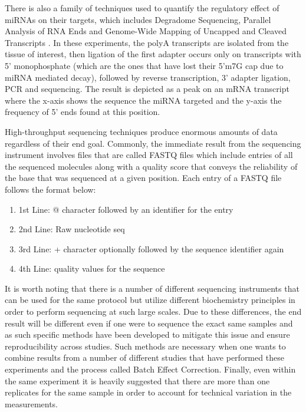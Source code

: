 \documentclass[en,ack]{dimscthesis}
\begin{document}
\par There is also a family of techniques used to quantify the regulatory effect of miRNAs on their targets, which includes Degradome Sequencing, Parallel Analysis of RNA Ends and Genome-Wide Mapping of Uncapped and Cleaved Transcripts \parencite{gregoryLinkRNAMetabolism2008, addo-quayeEndogenousSiRNAMiRNA2008, germanConstructionParallelAnalysis2009}. In these experiments, the polyA transcripts are isolated from the tissue of interest, then ligation of the first adapter occurs only on transcripts with 5' monophosphate (which are the ones that have lost their 5'm7G cap due to miRNA mediated decay), followed by reverse transcription, 3' adapter ligation, PCR and sequencing. The result is depicted as a peak on an mRNA transcript where the x-axis shows the sequence the miRNA targeted and the y-axis the frequency of 5' ends found at this position.

\par High-throughput sequencing techniques produce enormous amounts of data regardless of their end goal. Commonly, the immediate result from the sequencing instrument involves files that are called FASTQ files which include entries of all the sequenced molecules along with a quality score that conveys the reliability of the base that was sequenced at a given position. Each entry of a FASTQ file follows the format below:
\begin{enumerate}
	\item 1st Line: @ character followed by an identifier for the entry
	\item 2nd Line: Raw nucleotide seq
	\item 3rd Line: + character optionally followed by the sequence identifier again
	\item 4th Line: quality values for the sequence
\end{enumerate}

\par It is worth noting that there is a number of different sequencing instruments that can be used for the same protocol but utilize different biochemistry principles in order to perform sequencing at such large scales. Due to these differences, the end result will be different even if one were to sequence the exact same samples and as such specific methods have been developed to mitigate this issue and ensure reproducibility across studies. Such methods are necessary when one wants to combine results from a number of different studies that have performed these experiments and the process called Batch Effect Correction. Finally, even within the same experiment it is heavily suggested that there are more than one replicates for the same sample in order to account for technical variation in the measurements.
\end{document}
